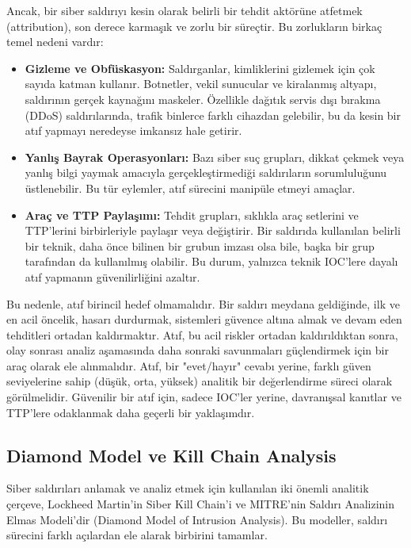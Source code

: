Ancak, bir siber saldırıyı kesin olarak belirli bir tehdit aktörüne atfetmek (attribution), son derece karmaşık ve zorlu bir süreçtir. Bu zorlukların birkaç temel nedeni vardır:

\begin{itemize}
    \item \textbf{Gizleme ve Obfüskasyon:} Saldırganlar, kimliklerini gizlemek için çok sayıda katman kullanır. Botnetler, vekil sunucular ve kiralanmış altyapı, saldırının gerçek kaynağını maskeler. Özellikle dağıtık servis dışı bırakma (DDoS) saldırılarında, trafik binlerce farklı cihazdan gelebilir, bu da kesin bir atıf yapmayı neredeyse imkansız hale getirir.
    \item \textbf{Yanlış Bayrak Operasyonları:} Bazı siber suç grupları, dikkat çekmek veya yanlış bilgi yaymak amacıyla gerçekleştirmediği saldırıların sorumluluğunu üstlenebilir. Bu tür eylemler, atıf sürecini manipüle etmeyi amaçlar.
    \item \textbf{Araç ve TTP Paylaşımı:} Tehdit grupları, sıklıkla araç setlerini ve TTP'lerini birbirleriyle paylaşır veya değiştirir. Bir saldırıda kullanılan belirli bir teknik, daha önce bilinen bir grubun imzası olsa bile, başka bir grup tarafından da kullanılmış olabilir. Bu durum, yalnızca teknik IOC'lere dayalı atıf yapmanın güvenilirliğini azaltır.
\end{itemize}

Bu nedenle, atıf birincil hedef olmamalıdır. Bir saldırı meydana geldiğinde, ilk ve en acil öncelik, hasarı durdurmak, sistemleri güvence altına almak ve devam eden tehditleri ortadan kaldırmaktır. Atıf, bu acil riskler ortadan kaldırıldıktan sonra, olay sonrası analiz aşamasında daha sonraki savunmaları güçlendirmek için bir araç olarak ele alınmalıdır. Atıf, bir "evet/hayır" cevabı yerine, farklı güven seviyelerine sahip (düşük, orta, yüksek) analitik bir değerlendirme süreci olarak görülmelidir. Güvenilir bir atıf için, sadece IOC'ler yerine, davranışsal kanıtlar ve TTP'lere odaklanmak daha geçerli bir yaklaşımdır.

\subsection{Diamond Model ve Kill Chain Analysis}

Siber saldırıları anlamak ve analiz etmek için kullanılan iki önemli analitik çerçeve, Lockheed Martin'in Siber Kill Chain’i ve MITRE’nin Saldırı Analizinin Elmas Modeli’dir (Diamond Model of Intrusion Analysis). Bu modeller, saldırı sürecini farklı açılardan ele alarak birbirini tamamlar.

